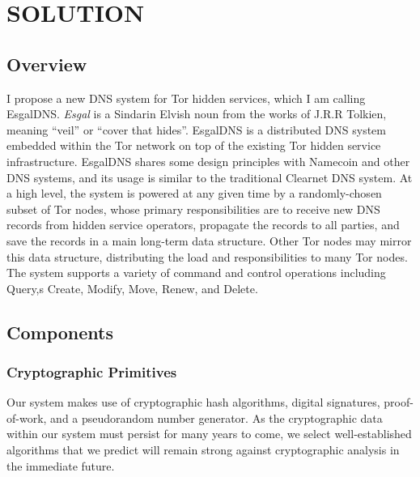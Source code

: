 
\chapter{SOLUTION}

\section{Overview}

I propose a new DNS system for Tor hidden services, which I am calling EsgalDNS. \emph{Esgal} is a Sindarin Elvish noun from the works of J.R.R Tolkien, meaning ``veil'' or ``cover that hides''.\cite{SindarinDict} EsgalDNS is a distributed DNS system embedded within the Tor network on top of the existing Tor hidden service infrastructure. EsgalDNS shares some design principles with Namecoin and other DNS systems, and its usage is similar to the traditional Clearnet DNS system. At a high level, the system is powered at any given time by a randomly-chosen subset of Tor nodes, whose primary responsibilities are to receive new DNS records from hidden service operators, propagate the records to all parties, and save the records in a main long-term data structure. Other Tor nodes may mirror this data structure, distributing the load and responsibilities to many Tor nodes. The system supports a variety of command and control operations including Query,s Create, Modify, Move, Renew, and Delete. 

\section{Components}

\subsection{Cryptographic Primitives}

Our system makes use of cryptographic hash algorithms, digital signatures, proof-of-work, and a pseudorandom number generator. As the cryptographic data within our system must persist for many years to come, we select well-established algorithms that we predict will remain strong against cryptographic analysis in the immediate future.

